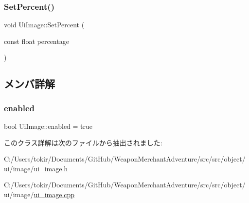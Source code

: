 \mbox{\label{class_ui_image_a3c006a6e60e8af7c43d2548b78746e85}} 
\subsubsection{\texorpdfstring{Set\+Percent()}{SetPercent()}}
{\footnotesize\ttfamily void Ui\+Image\+::\+Set\+Percent (\begin{DoxyParamCaption}\item[{const float}]{percentage }\end{DoxyParamCaption})\hspace{0.3cm}{\ttfamily [inline]}}



\subsection{メンバ詳解}
\mbox{\label{class_ui_image_a34d64237c00b41c32122d996c2f35f3a}} 
\subsubsection{\texorpdfstring{enabled}{enabled}}
{\footnotesize\ttfamily bool Ui\+Image\+::enabled = true}



このクラス詳解は次のファイルから抽出されました\+:\begin{DoxyCompactItemize}
\item 
C\+:/\+Users/tokir/\+Documents/\+Git\+Hub/\+Weapon\+Merchant\+Adventure/src/src/object/ui/image/\mbox{\hyperlink{ui__image_8h}{ui\+\_\+image.\+h}}\item 
C\+:/\+Users/tokir/\+Documents/\+Git\+Hub/\+Weapon\+Merchant\+Adventure/src/src/object/ui/image/\mbox{\hyperlink{ui__image_8cpp}{ui\+\_\+image.\+cpp}}\end{DoxyCompactItemize}
